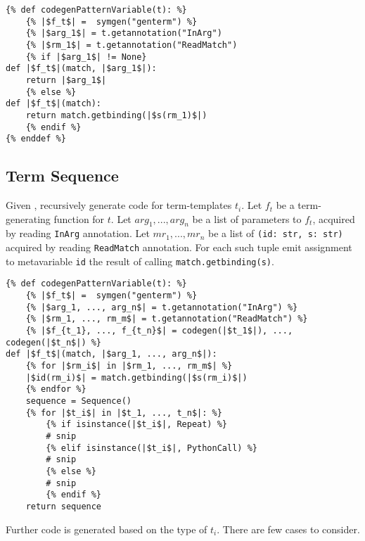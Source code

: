 \begin{verbatim}
{% def codegenPatternVariable(t): %}
	{% |$f_t$| =  symgen("genterm") %}
	{% |$arg_1$| = t.getannotation("InArg")
	{% |$rm_1$| = t.getannotation("ReadMatch")
	{% if |$arg_1$| != None}
def |$f_t$|(match, |$arg_1$|):
	return |$arg_1$|
	{% else %}
def |$f_t$|(match):
	return match.getbinding(|$s(rm_1)$|)
	{% endif %}
{% enddef %}

\end{verbatim}

\subsection{Term Sequence}

Given \TermSequence, recursively generate code for term-templates $t_i$. Let $f_t$ be a term-generating function for $t$. Let $arg_1, ..., arg_n$ be a list of parameters to $f_t$, acquired by reading \texttt{InArg} annotation. Let $mr_1, ..., mr_n$ be a list of \texttt{(id: str, s: str)} acquired by reading \texttt{ReadMatch} annotation. For each such tuple emit assignment to metavariable \texttt{id} the result of calling \texttt{match.getbinding(s)}.

\begin{verbatim}
{% def codegenPatternVariable(t): %}
	{% |$f_t$| =  symgen("genterm") %}
	{% |$arg_1, ..., arg_n$| = t.getannotation("InArg") %}
	{% |$rm_1, ..., rm_m$| = t.getannotation("ReadMatch") %}
	{% |$f_{t_1}, ..., f_{t_n}$| = codegen(|$t_1$|), ..., codegen(|$t_n$|) %}
def |$f_t$|(match, |$arg_1, ..., arg_n$|):
	{% for |$rm_i$| in |$rm_1, ..., rm_m$| %}
	|$id(rm_i)$| = match.getbinding(|$s(rm_i)$|)
	{% endfor %}
	sequence = Sequence()
	{% for |$t_i$| in |$t_1, ..., t_n$|: %}
		{% if isinstance(|$t_i$|, Repeat) %}
		# snip 
		{% elif isinstance(|$t_i$|, PythonCall) %}
		# snip
		{% else %}
		# snip
		{% endif %}
	return sequence
\end{verbatim}

Further code is generated based on the type of $t_i$. There are few cases to consider.

